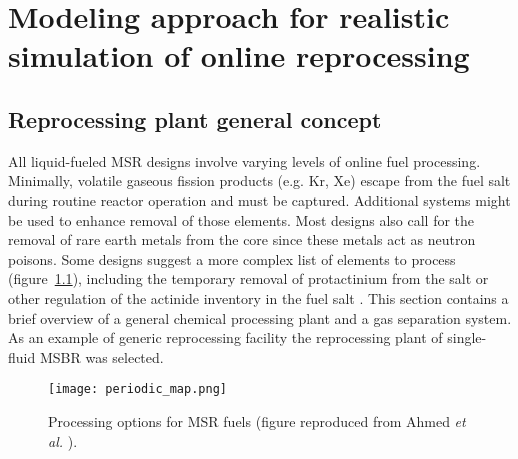 \chapter[Modeling approach for realistic simulation of online reprocessing]{Modeling approach for realistic simulation of online reprocessing}

\section{Reprocessing plant general concept}
All liquid-fueled \gls{MSR} designs involve varying levels of online fuel processing. Minimally, volatile gaseous fission products (e.g. Kr, Xe) escape from the fuel salt during routine reactor operation and must be captured. Additional systems might be used to enhance removal of those elements. Most designs also call for the removal of rare earth metals from the core since these metals act as neutron poisons. Some designs suggest a more complex list of elements to process (figure~\ref{fig:periodic_tab}), including the temporary removal of protactinium from the salt or other regulation of the actinide inventory in the fuel salt \cite{ahmad_neutronics_2015}. This section contains a brief overview of a general chemical 
processing plant and a gas separation system. As an example of generic reprocessing facility the reprocessing plant of single-fluid \gls{MSBR} was selected. 
\begin{figure}[htp!] %
  \centering
  \texttt{[image: periodic\_map.png]}
  \caption{Processing options for \gls{MSR} fuels (figure reproduced from 
  Ahmed \emph{et al.} \cite{ahmad_neutronics_2015}).}
  \label{fig:periodic_tab}
\end{figure}

